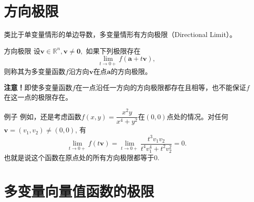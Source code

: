 
\section{方向极限}


\begin{frame}

类比于单变量情形的单边导数，多变量情形有方向极限（Directional Limit）。

\pause

\begin{block}{方向极限}
设$\mathbf{v}\in\mathbb{R}^n, \mathbf{v} \neq \mathbf{0},$ 如果下列极限存在
$$\lim\limits_{t\to0+} f(\mathbf{a} + t\mathbf{v}),$$
则称其为多变量函数$f$沿方向$\mathbf{v}$在点$\mathbf{a}$的方向极限。
\end{block}

\pause

{\bfseries 注意！}即使多变量函数$f$在一点沿任一方向的方向极限都存在且相等，也不能保证$f$在这一点的极限存在。

\end{frame}


\begin{frame}

\begin{block}{例子}
例如，还是考虑函数\(\displaystyle f(x,y) = \dfrac{x^2y}{x^4+y^2}\)在$(0,0)$点处的情况。对任何$\mathbf{v} = (v_1,v_2)\neq(0,0)$, 有
$$\lim\limits_{t\to0+} f(t\mathbf{v}) = \lim\limits_{t\to0+} \dfrac{t^3v_1v_2}{t^4v_1^4 + t^2v_2^2} = 0.$$
也就是说这个函数在原点处的所有方向极限都等于$0$.
\end{block}


\end{frame}


\section{多变量向量值函数的极限}


